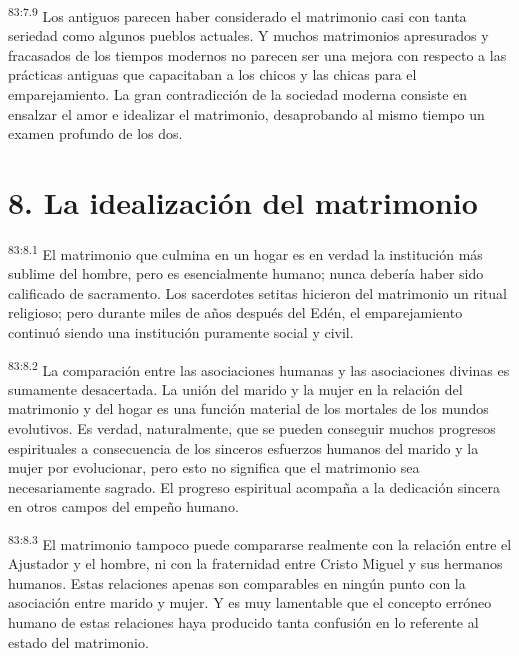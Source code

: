 \par
\textsuperscript{83:7.9} Los antiguos parecen haber considerado el matrimonio casi con tanta seriedad como algunos pueblos actuales. Y muchos matrimonios apresurados y fracasados de los tiempos modernos no parecen ser una mejora con respecto a las prácticas antiguas que capacitaban a los chicos y las chicas para el emparejamiento. La gran contradicción de la sociedad moderna consiste en ensalzar el amor e idealizar el matrimonio, desaprobando al mismo tiempo un examen profundo de los dos.

\section*{8. La idealización del matrimonio}
\par
\textsuperscript{83:8.1} El matrimonio que culmina en un hogar es en verdad la institución más sublime del hombre, pero es esencialmente humano; nunca debería haber sido calificado de sacramento. Los sacerdotes setitas hicieron del matrimonio un ritual religioso; pero durante miles de años después del Edén, el emparejamiento continuó siendo una institución puramente social y civil.

\par
\textsuperscript{83:8.2} La comparación entre las asociaciones humanas y las asociaciones divinas es sumamente desacertada. La unión del marido y la mujer en la relación del matrimonio y del hogar es una función material de los mortales de los mundos evolutivos. Es verdad, naturalmente, que se pueden conseguir muchos progresos espirituales a consecuencia de los sinceros esfuerzos humanos del marido y la mujer por evolucionar, pero esto no significa que el matrimonio sea necesariamente sagrado. El progreso espiritual acompaña a la dedicación sincera en otros campos del empeño humano.

\par
\textsuperscript{83:8.3} El matrimonio tampoco puede compararse realmente con la relación entre el Ajustador y el hombre, ni con la fraternidad entre Cristo Miguel y sus hermanos humanos. Estas relaciones apenas son comparables en ningún punto con la asociación entre marido y mujer. Y es muy lamentable que el concepto erróneo humano de estas relaciones haya producido tanta confusión en lo referente al estado del matrimonio.

